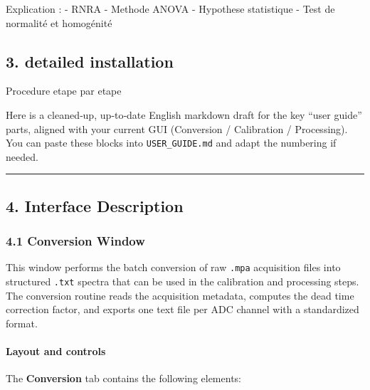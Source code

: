 Explication : - RNRA - Methode ANOVA - Hypothese statistique - Test de
normalité et homogénité

\hypertarget{detailed-installation}{%
\subsection{3. detailed installation}\label{detailed-installation}}

Procedure etape par etape

Here is a cleaned‑up, up‑to‑date English markdown draft for the key
``user guide'' parts, aligned with your current GUI (Conversion /
Calibration / Processing). You can paste these blocks into
\texttt{USER\_GUIDE.md} and adapt the numbering if needed.

\begin{center}\rule{0.5\linewidth}{0.5pt}\end{center}

\hypertarget{interface-description}{%
\subsection{4. Interface Description}\label{interface-description}}

\hypertarget{conversion-window}{%
\subsubsection{4.1 Conversion Window}\label{conversion-window}}

This window performs the batch conversion of raw \texttt{.mpa}
acquisition files into structured \texttt{.txt} spectra that can be used
in the calibration and processing steps. The conversion routine reads
the acquisition metadata, computes the dead time correction factor, and
exports one text file per ADC channel with a standardized format.

\hypertarget{layout-and-controls}{%
\paragraph{Layout and controls}\label{layout-and-controls}}

The \textbf{Conversion} tab contains the following elements:

